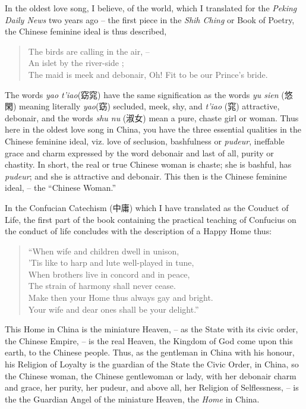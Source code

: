 In the oldest love song, I believe, of the world, which I translated for the \emph{Peking Daily News} two years ago
-- the first piece in the \emph{Shih Ching} or Book of Poetry, the Chinese feminine ideal is thus described,
\begin{quote}
The birds are calling in the air, -- \\
An islet by the river-side ; \\
The maid is meek and debonair,
Oh! Fit to be our Prince's bride.
\end{quote}
The words \emph{yao t'iao}(窈窕) have the same signification as the words \emph{yu sien} (悠閑)
meaning literally \emph{yao}(窈) secluded, meek, shy,
and \emph{t'iao} (窕) attractive, debonair,
and the words \emph{shu nu} (淑女) mean a pure, chaste girl or woman.
Thus here in the oldest love song in China, you have the three essential qualities in the Chinese feminine ideal,
viz. love of seclusion, bashfulness or \emph{pudeur},
ineffable grace and charm expressed by the word debonair and last of all,
purity or chastity.
In short, the real or true Chinese woman is chaste; she is bashful, has \emph{pudeur};
and she is attractive and debonair.
This then is the Chinese feminine ideal, -- the ``Chinese Woman.''

In the Confucian Catechism (中庸) which I have translated as
the Couduct of Life, the first part of the book containing the practical teaching of Confucius on the conduct of life concludes with the description of a Happy Home thus:
\begin{quote}
``When wife and children dwell in unison, \\
'Tis like to harp and lute well-played in tune, \\
When brothers live in concord and in peace, \\
The strain of harmony shall never cease. \\
Make then your Home thus always gay and bright. \\
Your wife and dear ones shall be your delight.''
\end{quote}
This Home in China is the miniature Heaven,
-- as the State with its civic order, the Chinese Empire,
-- is the real Heaven, the Kingdom of God come upon this earth,
to the Chinese people.
Thus, as the gentleman in China with his honour, his Religion of Loyalty is the guardian of the State the Civic Order, in China, so the Chinese woman,
the Chinese gentlewoman or lady, with her debonair charm and grace,
her purity, her pudeur, and above all, her Religion of Selflessness,
-- is the the Guardian Angel of the miniature Heaven, the \emph{Home} in China.


